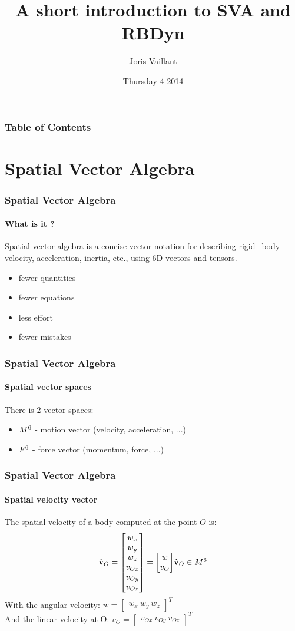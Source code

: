 \documentclass{beamer}
\title
{A short introduction to SVA and RBDyn}
\author
{Joris Vaillant}
\institute{LIRMM}{}
\date{Thursday 4 2014}
\begin{document}
\frame{\titlepage}

\begin{frame}
	\frametitle{Table of Contents}
	\tableofcontents
\end{frame}


\section{Spatial Vector Algebra}
\begin{frame}
\frametitle{Spatial Vector Algebra}
\framesubtitle{What is it ?}
Spatial vector algebra is a concise vector notation for describing rigid−body velocity,
acceleration, inertia, etc., using 6D vectors and tensors.
\begin{itemize}
	\item fewer quantities
	\item fewer equations
	\item less effort
	\item fewer mistakes
\end{itemize}
\end{frame}


\begin{frame}
\frametitle{Spatial Vector Algebra}
\framesubtitle{Spatial vector spaces}
There is 2 vector spaces:
\begin{itemize}
	\item $ M^{6} $ - motion vector (velocity, acceleration, ...)
	\item $ F^{6} $ - force vector (momentum, force, ...)
\end{itemize}
\end{frame}


\begin{frame}
\frametitle{Spatial Vector Algebra}
\framesubtitle{Spatial velocity vector}
The spatial velocity of a body computed at the point $ O $ is:
\begin{subequations}
	$$
	\velocityvecHatOrigin{O} = \begin{bmatrix} w_x \\ w_y \\ w_z \\ v_{Ox} \\ v_{Oy} \\ v_{Oz} \end{bmatrix} = \begin{bmatrix} w \\ v_O \end{bmatrix}
	$$
	$$
	\velocityvecHatOrigin{O} \in \motionspace{6}
	$$
\end{subequations}
With the angular velocity:
$ w = \begin{bmatrix} w_x\ w_y\ w_z \end{bmatrix}^T $\\
And the linear velocity at O:
$ v_O = \begin{bmatrix} v_{Ox}\ v_{Oy}\ v_{Oz} \end{bmatrix}^T $
\end{frame}
\end{document}
